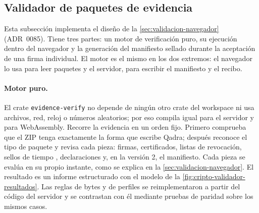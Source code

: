 
\subsection{Validador de paquetes de evidencia}\label{sec:impl-validador}

Esta subsección implementa el diseño de la \cref{sec:validacion-navegador} (ADR~0085). Tiene tres partes: un motor de verificación puro, su ejecución dentro del navegador y la generación del manifiesto sellado durante la aceptación de una firma individual. El motor es el mismo en los dos extremos: el navegador lo usa para leer paquetes y el servidor, para escribir el manifiesto y el recibo.

\paragraph{Motor puro.} El crate \texttt{evidence-verify} no depende de ningún otro crate del workspace ni usa archivos, red, reloj o números aleatorios; por eso compila igual para el servidor y para WebAssembly. Recorre la evidencia en un orden fijo. Primero comprueba que el ZIP tenga exactamente la forma que escribe Qadra; después reconoce el tipo de paquete y revisa cada pieza: firmas, certificados, listas de revocación, sellos de tiempo \cite{adams2001,housley2009}, declaraciones y, en la versión 2, el manifiesto. Cada pieza se evalúa en su propio instante, como se explica en la \cref{sec:validacion-navegador}. El resultado es un informe estructurado con el modelo de la \cref{fig:cripto-validador-resultados}. Las reglas de bytes y de perfiles se reimplementaron a partir del código del servidor y se contrastan con él mediante pruebas de paridad sobre los mismos casos.

